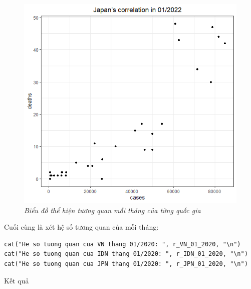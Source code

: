 \documentclass[a4paper]{article}
\theoremstyle{definition}
\begin{document}
\begin{enumerate}[1)]
\begin{figure}[H]
\begin{center}
        \includegraphics[scale = 0.3]{ix/ix.2/JPN_01_2022.png}
    \end{center}
        \vspace{+3mm}\caption{\it Biểu đồ thể hiện tương quan mỗi tháng của từng quốc gia}
    \end{figure}
Cuối cùng là xét hệ số tương quan của mỗi tháng:
\begin{lstlisting}
cat("He so tuong quan cua VN thang 01/2020: ", r_VN_01_2020, "\n")
cat("He so tuong quan cua IDN thang 01/2020: ", r_IDN_01_2020, "\n")
cat("He so tuong quan cua JPN thang 01/2020: ", r_JPN_01_2020, "\n")
\end{lstlisting}

Kết quả


\end{enumerate}
\end{document}
